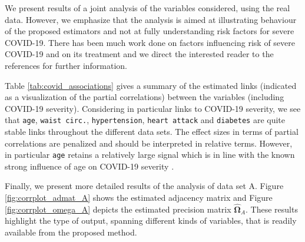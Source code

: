 We present results of a joint analysis of the variables considered, using the real data. 
However, we emphasize that the analysis is aimed at illustrating behaviour of the proposed estimators and not at fully understanding risk factors for severe COVID-19. There has been much work done on factors influencing risk of severe COVID-19 and on its treatment
\citep[see, among others,][]{williamson2020,berlin2020}
and we direct the interested reader to the references for further information.

Table \ref{tab:covid_associations} gives a summary of the estimated links (indicated as a visualization of the partial correlations) between the variables (including COVID-19 severity). Considering in particular links to COVID-19 severity, we see that \texttt{age}, \texttt{waist circ.}, \texttt{hypertension}, \texttt{heart attack} and \texttt{diabetes} are quite stable links throughout the different data sets. The effect sizes in terms of partial correlations are penalized and should be interpreted in relative terms. However, in particular \texttt{age} retains a relatively large signal which is in line with the known strong influence of age on COVID-19 severity \citep[see e.g][]{williamson2020}.

Finally, we present more detailed results of the analysis of data set A. Figure \ref{fig:corrplot_admat_A} shows the estimated adjacency matrix and Figure \ref{fig:corrplot_omega_A} depicts the estimated precision matrix $\hat{\boldsymbol\Omega}_{A}$. These results highlight the type of output, spanning different kinds of variables, that is readily available from the proposed method.